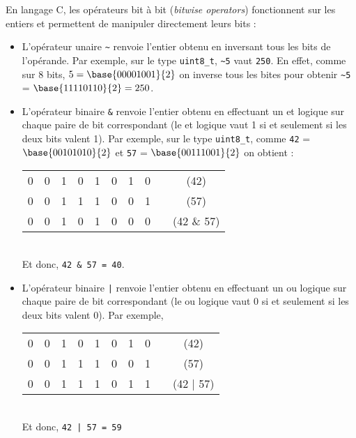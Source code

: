 \documentclass[11pt,a4paper]{article}
\begin{document}
\begin{Exercise}[title = {Implémentation des entiers par représentation binaire}]
\NRet \smallskip
En langage C, les opérateurs bit à bit (\textit{bitwise operators}) fonctionnent sur les entiers et permettent de manipuler directement leurs bits :
\begin{itemize}
\item L'opérateur unaire {\tt \textasciitilde} renvoie l'entier obtenu en inversant tous les bits de l'opérande. Par exemple, sur le type {\tt uint8\_t}, {\tt \textasciitilde 5} vaut {\tt 250}. En effet, comme sur 8 bits, $5 = \base{00001001}{2}$ on inverse tous les bites pour obtenir {\tt \textasciitilde 5} = $\base{11110110}{2} = 250$.
\item L'opérateur binaire {\tt \&} renvoie l'entier obtenu en effectuant un et logique sur chaque paire de bit correspondant (le et logique vaut 1 si et seulement si les deux bits valent 1). Par exemple, sur le type {\tt uint8\_t}, comme {\tt 42} = $\base{00101010}{2}$ et {\tt 57} = $\base{00111001}{2}$ on obtient : \\
\begin{tabular}{cccccccclc}
	0 & 0 & 1 & 0 & 1 & 0 & 1 & 0 & \quad & (42) \\
	0 & 0 & 1 & 1 & 1 & 0 & 0 & 1 & \quad & (57) \\
	\cline{1-8}
	0 & 0 & 1 & 0 & 1 & 0 & 0 & 0 & \quad & (42 \& 57) \\
\end{tabular} \\
Et donc, {\tt 42 \& 57 = 40}.
\item L'opérateur binaire {\tt |} renvoie l'entier obtenu en effectuant un ou logique sur chaque paire de bit correspondant (le ou logique vaut 0 si et seulement si les deux bits valent 0). Par exemple, \\
\begin{tabular}{cccccccclc}
	0 & 0 & 1 & 0 & 1 & 0 & 1 & 0 & \quad & (42) \\
	0 & 0 & 1 & 1 & 1 & 0 & 0 & 1 & \quad & (57) \\
	\cline{1-8}
	0 & 0 & 1 & 1 & 1 & 0 & 1 & 1 & \quad & (42 | 57) \\
\end{tabular} \\
Et donc, {\tt 42 | 57 = 59}
\end{itemize}
\Ret \smallskip



\end{Exercise}
\end{document}
